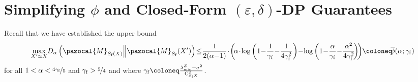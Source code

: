 \documentclass[11pt]{article}
\theoremstyle{definition}
\theoremstyle{plain}
\newcommand{\eps}{{\varepsilon}}
\providecommand{\KLDA}[2]{{D_{\alpha} \left( #1 \middle\| #2 \right)}}
\newcommand{\pM}{\pazocal{M}}
\renewcommand{\eps}{\varepsilon}
\begin{document}
\section{Simplifying $\phi$ and Closed-Form $(\eps, \delta)$-DP Guarantees}
\label{app:tcdp_bound}
Recall that we have established the upper bound 
\begin{align}
    \underset{X'\simeq X}{\max} \KLDA{\pM_{S_{\mathrm{f}}(X)}}{\pM_{S_{\mathrm{f}}}(X')} \hspace{-0.2em}\leq\hspace{-0.2em}  \frac{1}{2(\alpha\hspace{-0.2em}-\hspace{-0.2em}1)}\hspace{-0.15em}\cdot\hspace{-0.15em} \left(\hspace{-0.2em}\alpha\hspace{-0.15em}\cdot\hspace{-0.15em}\log\left(1 \hspace{-0.2em}-\hspace{-0.2em} \frac{1}{\gamma_{\mathrm{f}}} \hspace{-0.2em}-\hspace{-0.2em} \frac{1}{4\gamma_{\mathrm{f}}^2}\right) \hspace{-0.2em}-\hspace{-0.2em} \log\left(1 \hspace{-0.2em}-\hspace{-0.2em} \frac{\alpha}{\gamma_{\mathrm{f}}} \hspace{-0.2em}-\hspace{-0.2em} \frac{\alpha^2}{4\gamma_{\mathrm{f}}^2}\hspace{-0.2em}\right)\hspace{-0.2em}\right) \hspace{-0.2em}\coloneq\hspace{-0.2em} \overline{\phi}(\alpha; \gamma_{\mathrm{f}})
\end{align}
for all $1 < \alpha < \nicefrac{4\gamma_{\mathrm{f}}}{5}$ and $\gamma_{\mathrm{f}} > \nicefrac{5}{4}$ and where $\gamma_{\mathrm{f}} \coloneq \frac{\lambda^{Z}_{\min} + \sigma^2}{\textsc{C}^2_{S_{\mathrm{f}}X}}$. 
\end{document}
